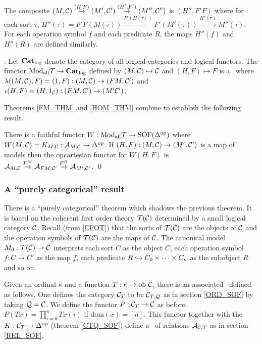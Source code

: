 The composite $(M,{{\bf \cal C}}) \stackrel{(H,F)}{\to} (M',{{\bf \cal C}'}) 
\stackrel{(H',F')}{\to} (M'',{{\bf \cal C}''})$ is $(H'',F'F)$ where for 
each sort $\tau$, $H''(\tau)= F'F(M(\tau)) \stackrel{F'(H(\tau))}{\to 
} F'(M'(\tau)) \stackrel{H'(\tau)}{\to} M''(\tau)$. For each 
operation symbol $f$ and each predicate $R$, the maps $H''(f)$ and 
$H''(R)$ are defined similarly.\medskip

: Let ${\mbox{\bf Cat}}_{\rm log}$ denote the 
category of all logical categories and logical functors. The functor 
$\mbox{Mod}_{\rm all} \cal T \to {\mbox{\bf Cat}}_{\rm log}$ defined 
by $(M,{{\bf \cal C}}) \mapsto {{\bf \cal C}}$ and $(H,F) \mapsto F$ is a \SOF\ 
where $\lambda((M,{{\bf \cal C}}),F) = (1,F) : (M,{{\bf \cal C}}) \to (FM,{{\bf \cal C}'})$ and $\iota(H,F) = (H,1_{{\bf \cal C}}) : (FM,{{\bf \cal C}'}) \to (M'{{\bf \cal C}'})$. \medskip

Theorems \ref{FM_THM} and \ref{HOM_THM} combine to establish the 
following result.

\begin{thm} There is a faithful functor $W : \mbox{Mod}_{\rm all} 
{\cal T} \to \mbox{SOF}(\Delta^{\rm op})$ where $W(M,{{\bf \cal C}}) = 
K_{M,{{\bf \cal C}}} : {{{\bf \cal A}}_{{M},{{\bf \cal C}}}} \to \Delta^{\rm op}$. If $(H,F) : (M,{{\bf \cal C}}) \to (M',{{\bf \cal C}'})$ is a map of models then the opcartesian 
functor for $W(H,F)$ is ${{{\bf \cal A}}_{{M},{{\bf \cal C}}}} \stackrel{F^M}{\to} {{{\bf \cal A}}_{{FM},{{\bf \cal C}'}}} \stackrel{F^H}{\to} {{{\bf \cal A}}_{{M'},{{\bf \cal C}'}}}$. \qed
\end{thm}

\subsubsection{A ``purely categorical'' result} 

There is a ``purely categorical'' theorem which shadows the previous 
theorem. It is based on the coherent first order theory ${\cal 
T}({{\bf \cal C}})$ determined by a small logical category ${\bf \cal C}$. Recall 
(from \ref{CFOT}) that the sorts of ${\cal T}({{\bf \cal C}})$ are the 
objects of ${\bf \cal C}$ and the operation symbols of ${\cal T}({{\bf \cal C}})$ 
are the maps of ${\bf \cal C}$. The canonical model $M_0 : {\cal T}({{\bf \cal C} 
}) \to {{\bf \cal C}}$ interprets each sort $C$ as the object $C$, each 
operation symbol $f : C \to C'$ as the map $f$, each predicate $R 
\hookrightarrow C_0 \times \cdots \times C_n$ as the subobject $R$ and so on. 

Given an ordinal $\kappa$ and a function $T : \kappa \to \mbox{ob 
}{{\bf \cal C}}$, there is an associated \SOF\ defined as follows. One 
defines the category ${{\bf \cal C}}_T$ to be ${{\bf \cal C}}_{T,{{\bf \cal Q}}}$ as in 
section \ref{ORD_SOF} by taking ${{\bf \cal Q}} = {{\bf \cal C}}$. We define the 
functor $P : {{\bf \cal C}}_T \to {{\bf \cal C}}$ as before: $P(Tx) = \prod_{i=0}^n 
Tx(i)$ if $\mbox{dom}(x)=[n]$. This functor together with the \SOF\ 
$K : {{\bf \cal C}}_T \to \Delta^{\rm op}$ (theorem \ref{CTQ_SOF}) define a 
\SOF\ of relations ${{\bf \cal A}}_{{{\bf \cal C}},T}$ as in section \ref{REL_SOF}. 

